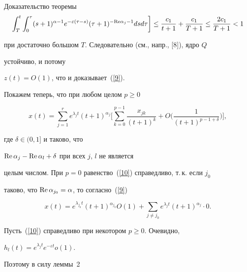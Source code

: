 \begin{pf*}{Доказательство теоремы}
\begin{gather*}
\int_T^t \int_0^\tau (s+1)^{\alpha-1}


e^{-\varepsilon(\tau-s)} (\tau+1)^{-{\rm Re}\alpha_{j}-1} 


ds d\tau \bigg] \le


\frac {c_1}{t+1}+\frac {c_1}{T+1}\le \frac {2c_1}{T+1}<1


\end{gather*}


при достаточно большом $T$. Следовательно (см., напр., [8]), ядро $Q$ 


устойчиво, и потому


$z (t)=O (1)$, что и доказывает~(\ref{9}).





Покажем теперь, что при любом целом $p\ge0$


\begin{equation}


\label{10}


x(t)=\sum\limits_{j=1}^{r} e^{\lambda_jt}(t+1)^{\alpha_{j}} \bigg[


\sum\limits_{k=0}^{p-1}\frac{x_{jk}}{(t+1)^{k}}+


O \bigg(\frac1{(t+1)^{p-1+\delta}} \bigg) \bigg],


\end{equation}


где $\delta\in(0,1]$ и таково, что


$\operatorname{Re} \alpha_{j}-\operatorname{Re} \alpha_{l}+\delta$ при всех $j$, $l$ не является


целым числом. При $p=0$ равенство~(\ref{10}) справедливо, т.\,к. если $j_0$ 


таково, что $\operatorname{Re} \alpha_{j_0}=\alpha$, то согласно~(\ref{9})


$$


x (t)=e^{\lambda_{j_0}t}(t+1)^{\alpha_{j_0}}O (1)+


\sum\limits_{j\neq j_0}e^{\lambda_jt}(t+1)^{\alpha_{j}}\cdot 0.


$$





Пусть~(\ref{10}) справедливо при некотором $p\ge0$. Очевидно,


$h_l (t)=e^{\lambda_jt}e^{-\varepsilon t}o (1)$. 


Поэтому в силу леммы~2


\begin{equation}


\label{11}



\end{equation}
\end{pf*}
